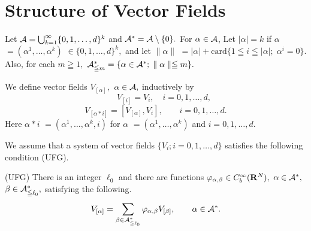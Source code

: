 \documentclass[12pt]{article}
\begin{document}
\section{Structure of Vector Fields}\label{vec}
Let ${\cal A}=\bigcup_{k = 1}^{\infty} \{ 0,1,\ldots , d \}^k$
and ${\cal A}^{*}= {\cal A} \setminus \{ 0\} .$ 
For $\alpha \in {\cal A}$, 
Let $|\alpha | = k$ if 
$\alpha $ $= (\alpha^1,\ldots ,\alpha^k)$
$\in \{ 0,1,\ldots , d \}^k ,$ and 
let $ \parallel \alpha \parallel $ 
$ = |\alpha | + \mbox{card}\{ 1 \leqq i \leqq |\alpha | ; 
\; \alpha^i = 0 \}.$ 
Also, for each $m\geqq 1,$ ${\cal A}^{*}_{\leqq m}  
=\{ \alpha \in {\cal A}^{*}; \; \parallel \alpha \parallel \leqq m \} .$

We define vector fields $V_{[\alpha ]},$ $\alpha \in {\cal A},$ 
inductively by
$$
\qquad V_{[i]} = V_i, 
\quad i = 0,1,\ldots ,d,
$$
$$
V_{[\alpha *i]} = [V_{[\alpha ]},V_i], 
\qquad i = 0,1,\ldots ,d.
$$
Here $\alpha *i$ 
$= (\alpha^1,\ldots ,\alpha^k,i)$
for $\alpha $ $= (\alpha^1,\ldots ,\alpha^k)$ and $i = 0,1,\ldots ,d.$

We assume that a system of vector fields $\{ V_i ; i=0,1,\ldots ,d \}$ 
satisfies the following condition (UFG).

\noindent
(UFG) There is an integer $\ell_0$ 
and there are functions $\varphi_{\alpha,\beta} \in C^{\infty}_b({\bf R}^N),$ 
$\alpha \in {\cal A}^{*},$ $\beta \in {\cal A}^{*}_{\leqq \ell_0},$ 
satisfying the following.
$$
{\displaystyle V_{[\alpha ]} 
= \sum_{\beta \in {\cal A}^{*}_{\leqq \ell_0}}
\varphi_{\alpha,\beta}V_{[\beta ]}},
\qquad 
\alpha \in {\cal A}^{*}.
$$
\end{document}
